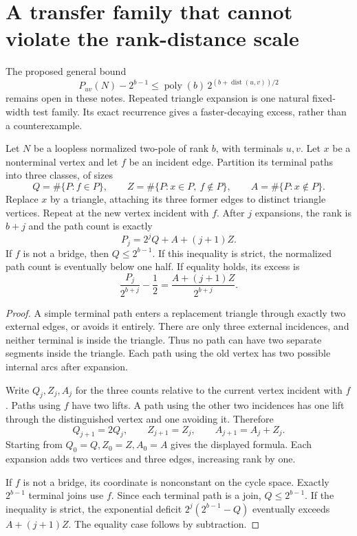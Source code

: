 \section{A transfer family that cannot violate the rank-distance scale}
\label{sec:four-high-connectivity-path-transfers}

The proposed general bound
\[
 P_{uv}(N)-2^{b-1}
 \le \operatorname{poly}(b)\,2^{(b+\operatorname{dist}(u,v))/2}
\]
remains open in these notes.
Repeated triangle expansion is one natural fixed-width test family.
Its exact recurrence gives a faster-decaying excess, rather than a counterexample.

\begin{proposition}
\label{prop:four-triangle-path-transfer}
Let $N$ be a loopless normalized two-pole of rank $b$, with terminals $u,v$.
Let $x$ be a nonterminal vertex and let $f$ be an incident edge.
Partition its terminal paths into three classes, of sizes
\[
 Q=\#\{P:f\in P\},\qquad
 Z=\#\{P:x\in P,\ f\notin P\},\qquad
 A=\#\{P:x\notin P\}.
\]
Replace $x$ by a triangle, attaching its three former edges to distinct triangle vertices.
Repeat at the new vertex incident with $f$.
After $j$ expansions, the rank is $b+j$ and the path count is exactly
\[
 P_j=2^jQ+A+(j+1)Z.
\]
If $f$ is not a bridge, then $Q\le2^{b-1}$.
If this inequality is strict, the normalized path count is eventually below one half.
If equality holds, its excess is
\[
 \frac{P_j}{2^{b+j}}-\frac12
 =\frac{A+(j+1)Z}{2^{b+j}}.
\]
\end{proposition}

\begin{proof}
A simple terminal path enters a replacement triangle through exactly two external edges, or avoids it entirely.
There are only three external incidences, and neither terminal is inside the triangle.
Thus no path can have two separate segments inside the triangle.
Each path using the old vertex has two possible internal arcs after expansion.

Write $Q_j,Z_j,A_j$ for the three counts relative to the current vertex incident with $f$.
Paths using $f$ have two lifts.
A path using the other two incidences has one lift through the distinguished vertex and one avoiding it.
Therefore
\[
 Q_{j+1}=2Q_j,\qquad Z_{j+1}=Z_j,\qquad A_{j+1}=A_j+Z_j.
\]
Starting from $Q_0=Q,Z_0=Z,A_0=A$ gives the displayed formula.
Each expansion adds two vertices and three edges, increasing rank by one.

If $f$ is not a bridge, its coordinate is nonconstant on the cycle space.
Exactly $2^{b-1}$ terminal joins use $f$.
Since each terminal path is a join, $Q\le2^{b-1}$.
If the inequality is strict, the exponential deficit $2^j(2^{b-1}-Q)$ eventually exceeds $A+(j+1)Z$.
The equality case follows by subtraction.
\end{proof}


